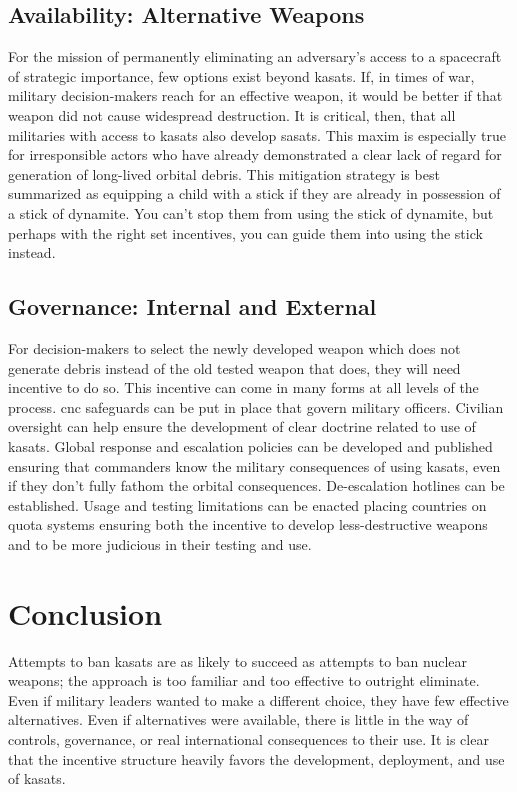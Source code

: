 \subsection*{Availability: Alternative Weapons}
For the mission of permanently eliminating an adversary's access to a
spacecraft of strategic importance, few options exist beyond
\acp{kasat}.  If, in times of war, military decision-makers reach for
an effective weapon, it would be better if that weapon did not cause
widespread destruction.  It is critical, then, that all militaries
with access to \acp{kasat} also develop \acp{sasat}.  This maxim is
especially true for irresponsible actors who have already demonstrated
a clear lack of regard for generation of long-lived orbital debris.
This mitigation strategy is best summarized as equipping a child with
a stick if they are already in possession of a stick of dynamite.  You
can't stop them from using the stick of dynamite, but perhaps with the
right set incentives, you can guide them into using the stick instead.

\subsection*{Governance: Internal and External}
For decision-makers to select the newly developed weapon which does
not generate debris instead of the old tested weapon that does, they
will need incentive to do so.  This incentive can come in many forms
at all levels of the process. \ac{cnc} safeguards can be put in place
that govern military officers.  Civilian oversight can help ensure the
development of clear doctrine related to use of \acp{kasat}.  Global
response and escalation policies can be developed and published
ensuring that commanders know the military consequences of using
\acp{kasat}, even if they don't fully fathom the orbital consequences.
De-escalation hotlines can be established.  Usage and testing
limitations can be enacted placing countries on quota systems ensuring
both the incentive to develop less-destructive weapons and to be more
judicious in their testing and use.

\section*{Conclusion}
Attempts to ban \acp{kasat} are as likely to succeed as attempts to
ban nuclear weapons; the approach is too familiar and too effective to
outright eliminate.  Even if military leaders wanted to make a
different choice, they have few effective alternatives.  Even if
alternatives were available, there is little in the way of controls,
governance, or real international consequences to their use.  It is
clear that the incentive structure heavily favors the development,
deployment, and use of \acp{kasat}.

